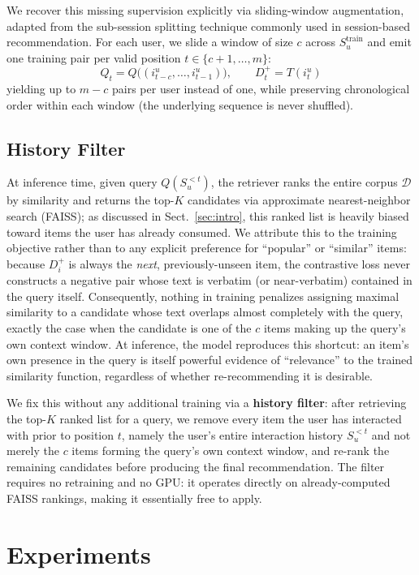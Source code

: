 \documentclass[runningheads]{llncs}
\begin{document}
We recover this missing supervision explicitly via sliding-window augmentation, adapted from the sub-session splitting technique commonly used in session-based recommendation. For each user, we slide a window of size $c$ across $S_u^{\text{train}}$ and emit one training pair per valid position $t \in \{c+1,\dots,m\}$:
\[
Q_t = Q\big((i_{t-c}^u,\dots,i_{t-1}^u)\big), \qquad D_t^+ = T(i_t^u)
\]
yielding up to $m-c$ pairs per user instead of one, while preserving chronological order within each window (the underlying sequence is never shuffled).

\subsection{History Filter}
\label{sec:filter}
At inference time, given query $Q(S_u^{<t})$, the retriever ranks the entire corpus $\mathcal{D}$ by similarity and returns the top-$K$ candidates via approximate nearest-neighbor search (FAISS); as discussed in Sect.~\ref{sec:intro}, this ranked list is heavily biased toward items the user has already consumed. We attribute this to the training objective rather than to any explicit preference for ``popular'' or ``similar'' items: because $D_i^+$ is always the \emph{next}, previously-unseen item, the contrastive loss never constructs a negative pair whose text is verbatim (or near-verbatim) contained in the query itself. Consequently, nothing in training penalizes assigning maximal similarity to a candidate whose text overlaps almost completely with the query, exactly the case when the candidate is one of the $c$ items making up the query's own context window. At inference, the model reproduces this shortcut: an item's own presence in the query is itself powerful evidence of ``relevance'' to the trained similarity function, regardless of whether re-recommending it is desirable.

We fix this without any additional training via a \textbf{history filter}: after retrieving the top-$K$ ranked list for a query, we remove every item the user has interacted with prior to position $t$, namely the user's entire interaction history $S_u^{<t}$ and not merely the $c$ items forming the query's own context window, and re-rank the remaining candidates before producing the final recommendation. The filter requires no retraining and no GPU: it operates directly on already-computed FAISS rankings, making it essentially free to apply.

\section{Experiments}
\label{sec:experiments}
\end{document}
